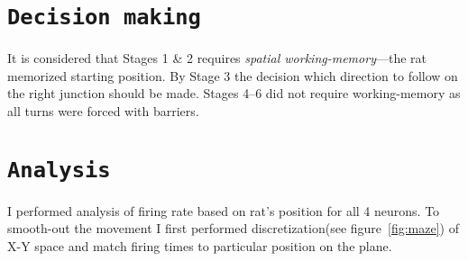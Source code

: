 \documentclass[12pt,a4paper,twocolumn]{article}
\begin{document}
\section*{\texttt{Decision making}}
It is considered that Stages 1 \& 2 requires \emph{spatial working-memory}---the rat memorized starting position. By Stage 3 the decision which direction to follow on the right junction should be made. Stages 4--6 did not require working-memory as all turns were forced with barriers.\\




\section*{\texttt{Analysis}}
I performed analysis of firing rate based on rat's position for all 4 neurons. To smooth-out the movement I first performed discretization(see figure~\ref{fig:maze}) of X-Y space and match firing times to particular position on the plane.\\

\end{document}
